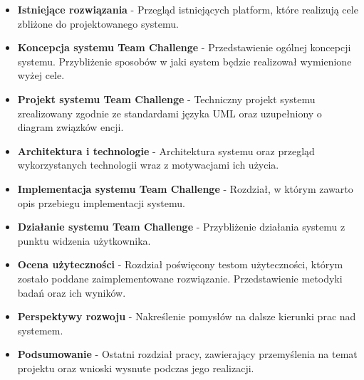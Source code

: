 \begin{itemize}

\item \textbf{Istniejące rozwiązania} - Przegląd istniejących platform, które realizują cele zbliżone do projektowanego systemu.  \\

\item \textbf{Koncepcja systemu Team Challenge} - Przedstawienie ogólnej koncepcji systemu. Przybliżenie sposobów w jaki system będzie realizował wymienione wyżej cele.   \\

\item \textbf{Projekt systemu Team Challenge} - Techniczny projekt systemu zrealizowany zgodnie ze standardami języka UML oraz uzupełniony o diagram związków encji. \\

\item \textbf{Architektura i technologie} - Architektura systemu oraz przegląd wykorzystanych technologii wraz z motywacjami ich użycia.  \\

\item \textbf{Implementacja systemu Team Challenge} - Rozdział, w którym zawarto opis przebiegu implementacji systemu.   \\

\item \textbf{Działanie systemu Team Challenge} - Przybliżenie działania systemu z punktu widzenia użytkownika.   \\

\item \textbf{Ocena użyteczności} - Rozdział poświęcony testom użyteczności, którym zostało poddane zaimplementowane rozwiązanie.  Przedstawienie metodyki badań oraz ich wyników. \\

\item \textbf{Perspektywy rozwoju} - Nakreślenie pomysłów na dalsze kierunki prac nad systemem.  \\

\item \textbf{Podsumowanie} - Ostatni rozdział pracy, zawierający przemyślenia na temat projektu oraz wnioski wysnute podczas jego realizacji.  \\

\end{itemize}


